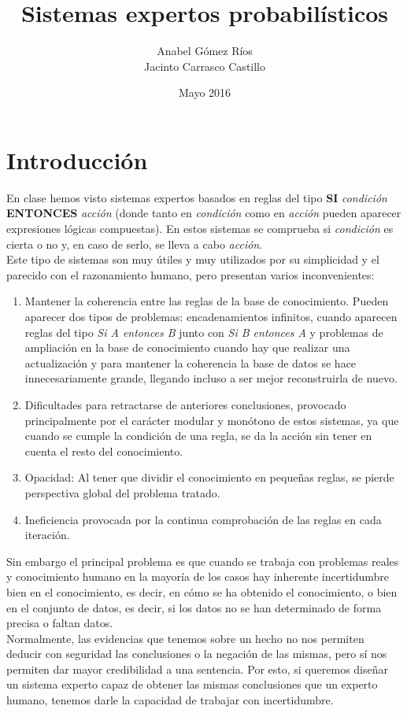 \documentclass{article}
\title{Sistemas expertos probabilísticos}
\author{Anabel Gómez Ríos\\
        Jacinto Carrasco Castillo}
\date{Mayo 2016}
\begin{document}
\maketitle

\section{Introducción}
En clase hemos visto sistemas expertos basados en reglas del tipo \textbf{SI} \textit{condición} \textbf{ENTONCES} \textit{acción} (donde tanto en \textit{condición} como en \textit{acción} pueden aparecer expresiones lógicas compuestas). En estos sistemas se comprueba si \textit{condición} es cierta o no y, en caso de serlo, se lleva a cabo \textit{acción}.\\

Este tipo de sistemas son muy útiles y muy utilizados por su simplicidad y el parecido con el razonamiento humano, pero presentan varios inconvenientes:
\begin{enumerate}
    \item Mantener la coherencia entre las reglas de la base de conocimiento. Pueden aparecer dos tipos de problemas: encadenamientos infinitos, cuando aparecen reglas del tipo \textit{Si A entonces B} junto con \textit{Si B entonces A} y problemas de ampliación en la base de conocimiento cuando hay que realizar una actualización y para mantener la coherencia la base de datos se hace innecesariamente grande, llegando incluso a ser mejor reconstruirla de nuevo.
    \item Dificultades para retractarse de anteriores conclusiones, provocado principalmente por el carácter modular y monótono de estos sistemas, ya que cuando se cumple la condición de una regla, se da la acción sin tener en cuenta el resto del conocimiento.
    \item Opacidad: Al tener que dividir el conocimiento en pequeñas reglas, se pierde perspectiva global del problema tratado.
    \item Ineficiencia provocada por la continua comprobación de las reglas en cada iteración.
\end{enumerate}

Sin embargo el principal problema es que cuando se trabaja con problemas reales y conocimiento humano en la mayoría de los casos hay inherente incertidumbre bien en el conocimiento, es decir, en cómo se ha obtenido el conocimiento, o bien en el conjunto de datos, es decir, si los datos no se han determinado de forma precisa o faltan datos.\\
Normalmente, las evidencias que tenemos sobre un hecho no nos permiten deducir con seguridad las conclusiones o la negación de las mismas, pero sí nos permiten dar mayor credibilidad a una sentencia. Por esto, si queremos diseñar un sistema experto capaz de obtener las mismas conclusiones que un experto humano, tenemos darle la capacidad de trabajar con incertidumbre.
\end{document}
